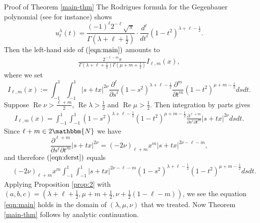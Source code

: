 \documentclass[12pt]{article}
\numberwithin{equation}{section}
\newcommand{\assign}{:=}
\newcommand{\tmop}[1]{\ensuremath{\operatorname{#1}}}
\newenvironment{proof*}[1]{\noindent{\textit{#1.\ }}}{\hspace*{\fill}$\Box$\medskip}
\newcommand{\mygrammarfootnote}[1]{}
\begin{document}
\begin{proof*}{Proof of Theorem \ref{main-thm}}
  The Rodrigues formula for the Gegenbauer polynomial (see
  {\cite[(6.4.14)]{andrews2000special}} for instance) shows
  \begin{equation} u_{\ell}^{\lambda} (t) = \frac{(- 1)^{\ell} 2^{- \ell} \sqrt{\pi}}{\Gamma
     \left( \lambda + \ell + \frac{1}{2} \right)} \cdot \frac{d^{\ell}}{d
     t^{\ell}} (1 - t^2)^{\lambda + \ell - \frac{1}{2}} . 
     \label{eqn:Rod} \end{equation}
  Then\mygrammarfootnote{maybe, we need a comma here?} the left-hand side of
  $(\ref{eqn:main})$ amounts to
  \begin{eqnarray}
    & \displaystyle\frac{2^{- \ell - m} \pi}{\Gamma \left( \lambda + \ell + \frac{1}{2}
    \right) \Gamma \left( \mu + m + \frac{1}{2} \right)} I_{\ell, m} (x), & 
    \nonumber
  \end{eqnarray}
  where we set
  \[ I_{\ell, m} (x) \assign \displaystyle\int_{- 1}^1 \displaystyle\int_{- 1}^1 | s + tx |^{2 \nu}
     \frac{\partial^{\ell}}{\partial s^{\ell}} (1 - s^2)^{\lambda + \ell -
     \frac{1}{2}} \frac{\partial^m}{\partial t^m} (1 - t^2)^{\mu + m -
     \frac{1}{2}} d s d t. \]
  Suppose $\tmop{Re} \nu > \frac{\ell + m}{2}$, $\tmop{Re} \lambda >
  \frac{1}{2}$ and $\tmop{Re} \mu > \frac{1}{2}$. Then
  integration by parts gives
  \begin{eqnarray}
    & I_{\ell, m} (x) = \displaystyle\int_{- 1}^1 \displaystyle\int_{- 1}^1 (1 - s^2)^{\lambda + \ell -
    \frac{1}{2}} (1 - t^2)^{\mu + m - \frac{1}{2}} \frac{\partial^{\ell +
    m}}{\partial s^{\ell} \partial t^m} | s + t x |^{2 \nu} d s d t. 
    \label{eqn:derst} & 
  \end{eqnarray}
  Since $\ell + m \in 2\mathbbm{N}$ we have
  \[ \frac{\partial^{\ell + m}}{\partial s^{\ell} \partial t^m} | s + tx |^{2
     \nu} = (- 2 \nu)_{\ell + m} x^m | s + t x |^{2 \nu - \ell - m}, \]
  and therefore $(\ref{eqn:derst})$ equals
  \begin{eqnarray}
    & (- 2 \nu)_{\ell + m} x^m \displaystyle\int_{- 1}^1 \displaystyle\int_{- 1}^1 | s + t x |^{2 \nu -
    \ell - m} (1 - s^2)^{\lambda + \ell - \frac{1}{2}} (1 - t^2)^{\mu + m -
    \frac{1}{2}} d s d t. &  \nonumber
  \end{eqnarray}
  Applying Proposition \ref{prop:2} with $(a,
  b, c) = \left( \lambda + \ell + \frac{1}{2}, \mu + m + \frac{1}{2}, \nu +
  \frac{1}{2} (1 - \ell - m) \right)$, we see\mygrammarfootnote{``that''?}
  the equation \eqref{eqn:main} holds in the domain of $(\lambda,\mu,\nu)$ that we treated. Now Theorem \ref{main-thm} follows
  by analytic continuation.
\end{proof*}
\end{document}
